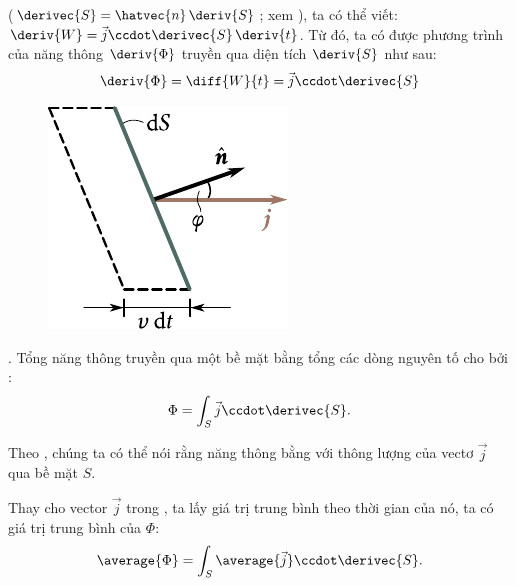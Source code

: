 \noindent
($\derivec{S}=\hatvec{n}\,\deriv{S}$; xem ), ta có thể viết: $\deriv{W} = \vec{j} \ccdot \derivec{S}\, \deriv{t}$. Từ đó, ta có được phương trình của năng thông $\deriv{\Phi}$ truyền qua diện tích $\deriv{S}$ như sau:
\begin{equation}\label{eq:14_49}
	\deriv{\Phi} = \diff{W}{t} = \vec{j} \ccdot \derivec{S}
\end{equation}

\begin{figure}[!htb]
	\begin{center}
		\includegraphics[scale=0.95]{figures/ch_14/fig_14_9.pdf}
		\caption[]{}
		\label{fig:14_9}
	\end{center}
	\vspace{-0.9cm}
\end{figure}

. Tổng năng thông truyền qua một bề mặt bằng tổng các dòng nguyên tố cho bởi :
\begin{equation}\label{eq:14_50}
	\Phi = \int_S \vec{j} \ccdot \derivec{S}.
\end{equation}

\noindent
Theo , chúng ta có thể nói rằng năng thông bằng với thông lượng của vectơ $\vec{j}$ qua bề mặt $S$.

Thay cho vector $\vec{j}$ trong , ta lấy giá trị trung bình theo thời gian của nó, ta có giá trị trung bình của $\Phi$:
\begin{equation}\label{eq:14_51}
	\average{\Phi} = \int_S \average{\vec{j}} \ccdot \derivec{S}.
\end{equation}

